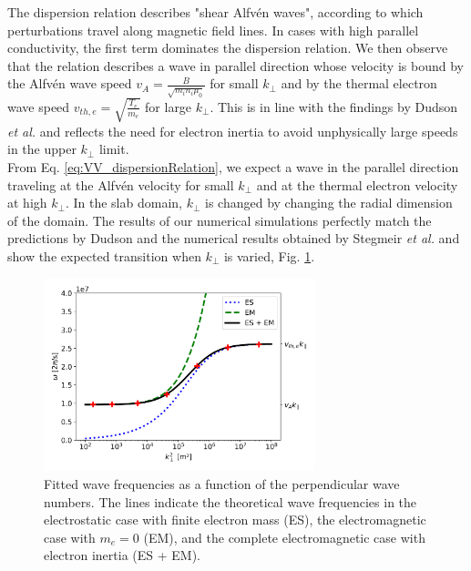 The dispersion relation describes "shear Alfvén waves", according to which perturbations travel along magnetic field lines. In cases with high parallel conductivity, the first term dominates the dispersion relation. We then observe that the relation describes a wave in parallel direction whose velocity is bound by the Alfvén wave speed $v_A = \frac{B}{\sqrt{m_in_i\mu_0}}$ for small $k_\perp$ and by the thermal electron wave speed $v_ {th,e} = \sqrt{\frac{T_e}{m_e}}$ for large $k_\perp$. This is in line with the findings by Dudson \emph{et al.}\cite{Dudson2021} and reflects the need for electron inertia to avoid unphysically large speeds in the upper $k_\perp$ limit. \\

From Eq. \ref{eq:VV_dispersionRelation}, we expect a wave in the parallel direction traveling at the Alfvén velocity for small $k_\perp$ and at the thermal electron velocity at high $k_\perp$. In the slab domain, $k_\perp$ is changed by changing the radial dimension of the domain. The results of our numerical simulations perfectly match the predictions by Dudson \cite{Dudson2021} and the numerical results obtained by Stegmeir \emph{et al.}\cite{stegmeir2019} and show the expected transition when $k_\perp$ is varied, Fig. \ref{fig:transitionSLAB}. \newline

\begin{figure}[h]\centering
	\centering
	\includegraphics[width=0.7\textwidth]{schemes/transitionAlfvenThermal.png}
	\caption{Fitted wave frequencies as a function of the perpendicular wave numbers. The lines indicate the theoretical wave frequencies in the electrostatic case with finite electron mass (ES), the electromagnetic case with $m_e = 0$ (EM), and the complete electromagnetic case with electron inertia (ES + EM).}
	\label{fig:transitionSLAB}
\end{figure}


